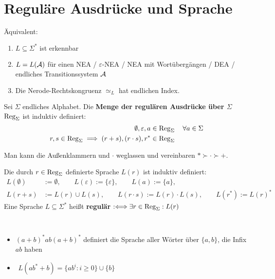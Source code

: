 \section{Reguläre Ausdrücke und Sprache}

\begin{korollar}
Äquivalent:
	\begin{enumerate}[label=\arabic*)]
		\item $L\subseteq\Sigma^\ast$ ist erkennbar
		\item $L=L(\mathcal{A})$ für einen NEA / $\varepsilon$-NEA / NEA mit Wortübergängen / DEA / endliches Transitionssystem $\mathcal{A}$
		\item Die Nerode-Rechtskongruenz $\simeq_L$ hat endlichen Index.
	\end{enumerate}
\end{korollar}

\begin{definition}\label{def5.1}
	Sei $\Sigma$ endliches Alphabet.
	Die \textbf{Menge der regulären Ausdrücke über $\Sigma$} $\operatorname{Reg}_\Sigma$ ist induktiv definiert:
	\begin{align*}
		\emptyset,\varepsilon,a&\in\operatorname{Reg}_\Sigma\quad\forall a\in\Sigma\\
		r,s\in\operatorname{Reg}_\Sigma\implies(r+s),(r\cdot s),r^\ast&\in\operatorname{Reg}_\Sigma
	\end{align*}
\end{definition}

Man kann die Außenklammern und $\cdot$ weglassen und vereinbaren $\ast\succ\cdot\succ +$.

\begin{definition}\label{def5.3}
	Die durch $r\in\operatorname{Reg}_\Sigma$ definierte Sprache $L(r)$ ist induktiv definiert:
	\begin{align*}
		L(\emptyset)&:=\emptyset,\qquad L(\varepsilon):=\lbrace\varepsilon\rbrace,\qquad L(a):=\lbrace a\rbrace,\\
		L(r+s)&:=L(r)\cup L(s),\qquad L(r\cdot s):=L(r)\cdot L(s),\qquad L(r^\ast):=L(r)^\ast
	\end{align*}
	Eine Sprache $L\subseteq\Sigma^\ast$ heißt \textbf{regulär} $:\Longleftrightarrow\exists r\in\operatorname{Reg}_\Sigma:L(r)$
\end{definition}

\begin{beispiel}\label{beisp5.4}\
	\begin{itemize}
		\item $(a+b)^\ast ab(a+b)^\ast$ definiert die Sprache aller Wörter über $\lbrace a,b\rbrace$, die Infix $ab$ haben
		\item $\begin{aligned}
			L(ab^\ast+b)=\big\lbrace ab^i:i\geq0\big\rbrace\cup\lbrace b\rbrace
		\end{aligned}$
	\end{itemize}
\end{beispiel}

